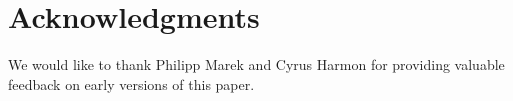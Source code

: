 \section{Acknowledgments} 

We would like to thank Philipp Marek and Cyrus Harmon for providing
valuable feedback on early versions of this paper.
